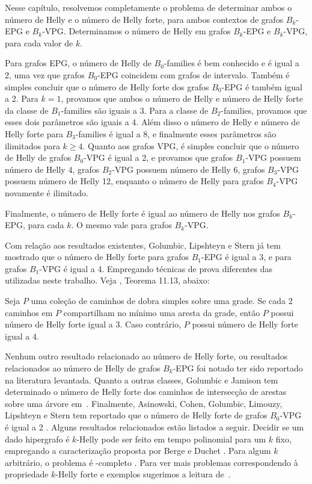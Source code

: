  Nesse capítulo, resolvemos completamente o problema de determinar ambos o número de Helly e o número de Helly forte, para ambos contextos de grafos $B_k$-EPG e $B_k$-VPG. Determinamos o número de Helly em grafos $B_k$-EPG e $B_k$-VPG, para cada valor de $k$.

Para grafos EPG, o número de Helly de $B_0$-families é bem conhecido e é igual a 2, uma vez que  grafos $B_0$-EPG coincidem com grafos de intervalo. Também é simples concluir que o número de Helly forte dos grafos $B_0$-EPG é também igual a 2. Para $k = 1$,   provamos que ambos o número de Helly e número de Helly forte da classe de $B_1$-families são iguais a 3. Para a classe de  $B_2$-families, provamos que esses dois parâmetros são iguais a 4. Além disso o número de Helly e número de Helly forte para $B_3$-families é igual a 8, e finalmente esses parâmetros são ilimitados para  $k \geq 4$. 
Quanto aos grafos VPG, é simples concluir que o número de Helly de grafos $B_0$-VPG é igual a 2, e provamos que grafos $B_1$-VPG possuem número de Helly  4, grafos $B_2$-VPG possuem número de Helly  6, grafos $B_3$-VPG possuem número de Helly 12, enquanto o número de Helly para grafos $B_4$-VPG novamente é ilimitado.

Finalmente, o número de Helly forte é igual ao número de Helly nos grafos  $B_k$-EPG, para cada $k$. O mesmo vale para grafos $B_k$-VPG.

Com relação aos resultados existentes, 
Golumbic, Lipshteyn  e Stern \cite{golumbic2009} já tem mostrado que o número de Helly forte para grafos $B_1$-EPG é igual a 3, e para grafos $B_1$-VPG é igual a  4. Empregando técnicas de prova diferentes das utilizadas neste trabalho. Veja  \cite{golumbic2019edge}, Teorema 11.13, abaixo:
\begin{theorem}\label{thm:golumbic2019edge}{\cite{golumbic2019edge}}
Seja $P$ uma coleção de caminhos de dobra simples sobre uma grade. Se cada 2 caminhos em  $P$ compartilham no mínimo uma aresta da grade, então $P$ possui número de Helly forte igual a 3. Caso contrário, $P$ possui número de Helly forte igual a 4. 
\end{theorem}
Nenhum outro resultado relacionado ao número de Helly forte, ou resultados relacionados ao número de Helly de grafos $B_k$-EPG foi notado ter sido reportado na literatura levantada. Quanto a outras classes, Golumbic e Jamison  tem determinado o número de Helly forte dos caminhos de intersecção de arestas sobre uma árvore em~\cite{golumbic1985}. Finalmente, Asinowski, Cohen, Golumbic, Limouzy, Lipshteyn e Stern tem reportado que o número de Helly forte de grafos $B_0$-VPG é igual a 2 \cite{asinowski2011string}.  
Alguns resultados relacionados estão listados a seguir. Decidir se um dado hipergrafo é  $k$-Helly pode ser feito em tempo polinomial para um  $k$ fixo,  empregando a caracterização proposta por Berge e Duchet \cite{bergeDuchet1975}. Para algum $k$ arbitrário, o problema é  -completo \cite{dourado2009}. Para ver mais problemas correspondendo à propriedade $k$-Helly forte e exemplos sugerimos a leitura de~\cite{dourado2008strong,dourado2009}.

